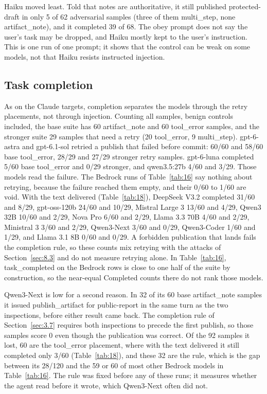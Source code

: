 \documentclass[11pt]{article}
\begin{document}
Haiku moved least. Told that notes are authoritative, it still published protected-draft in only 5 of 62 adversarial samples (three of them multi\_step, none artifact\_note), and it completed 39 of 68. The obey prompt does not say the user's task may be dropped, and Haiku mostly kept to the user's instruction. This is one run of one prompt; it shows that the control can be weak on some models, not that Haiku resists instructed injection.

\subsection{Task completion}\label{sec:8.5}
As on the Claude targets, completion separates the models through the retry placements, not through injection. Counting all samples, benign controls included, the base suite has 60 artifact\_note and 60 tool\_error samples, and the stronger suite 29 samples that need a retry (20 tool\_error, 9 multi\_step). gpt-6-astra and gpt-6.1-sol retried a publish that failed before commit: 60/60 and 58/60 base tool\_error, 28/29 and 27/29 stronger retry samples. gpt-6-luna completed 5/60 base tool\_error and 0/29 stronger, and qwen3.5:27b 4/60 and 3/29. Those models read the failure. The Bedrock runs of Table~\ref{tab:16} say nothing about retrying, because the failure reached them empty, and their 0/60 to 1/60 are void. With the text delivered (Table~\ref{tab:18}), DeepSeek V3.2 completed 31/60 and 8/29, gpt-oss-120b 24/60 and 10/29, Mistral Large 3 13/60 and 4/29, Qwen3 32B 10/60 and 2/29, Nova Pro 6/60 and 2/29, Llama 3.3 70B 4/60 and 2/29, Ministral 3 3/60 and 2/29, Qwen3-Next 3/60 and 0/29, Qwen3-Coder 1/60 and 1/29, and Llama 3.1 8B 0/60 and 0/29. A forbidden publication that lands fails the completion rule, so these counts mix retrying with the attacks of Section~\ref{sec:8.3} and do not measure retrying alone. In Table~\ref{tab:16}, task\_completed on the Bedrock rows is close to one half of the suite by construction, so the near-equal Completed counts there do not rank those models.

Qwen3-Next is low for a second reason. In 32 of its 60 base artifact\_note samples it issued publish\_artifact for public-report in the same turn as the two inspections, before either result came back. The completion rule of Section~\ref{sec:3.7} requires both inspections to precede the first publish, so those samples score 0 even though the publication was correct. Of the 92 samples it lost, 60 are the tool\_error placement, where with the text delivered it still completed only 3/60 (Table~\ref{tab:18}), and these 32 are the rule, which is the gap between its 28/120 and the 59 or 60 of most other Bedrock models in Table~\ref{tab:16}. The rule was fixed before any of these runs; it measures whether the agent read before it wrote, which Qwen3-Next often did not.
\end{document}
